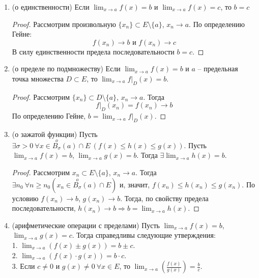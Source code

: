     \begin{enumerate}
        \item (о единственности) Если $\lim_{x \rightarrow a} f(x) = b$ и $\lim_{x \rightarrow a} f(x) = c$, то $b = c$
        \begin{proof}
            Рассмотрим произвольную $\{x_{n}\} \subset E \setminus \{a\}$, $x_{n} \rightarrow a$. По определению Гейне:
            \[f(x_{n}) \rightarrow b \text{ и } f(x_{n}) \rightarrow c\]
            В силу единственности предела последовательности $b = c$.
        \end{proof}
        \item (о пределе по подмножеству) Если $\lim_{x \rightarrow a} f(x) = b$ и $a$ -- предельная точка множества $D \subset E$, то $\lim_{x \rightarrow a} f|_{D}(x) = b$.
        \begin{proof}
            Рассмотрим $\{x_{n}\} \subset D \setminus \{a\}$, $x_{n} \rightarrow a$. Тогда
            \[f|_{D}(x_{n}) = f(x_{n}) \rightarrow b\]
            По определению Гейне, $b = \lim_{x \rightarrow a} f|_{D}(x)$.
        \end{proof}
        \item (о зажатой функции) Пусть $\exists \sigma > 0 \ \forall x \in \overset{o}{B_{\sigma}} (a) \cap E \ (f(x) \leq h(x) \leq g(x))$. Пусть $\lim_{x \rightarrow a} f(x) = b$, $\lim_{x \rightarrow a} g(x) = b$. Тогда $\exists \lim_{x \rightarrow a} h(x) = b$.
        \begin{proof}
            Рассмотрим $x_{n} \subset E \setminus \{a\}$, $x_{n} \rightarrow a$. Тогда $\exists n_{0} \ \forall n \geq n_{0} (x_{n} \in \overset{o}{B_{\sigma}}(a) \cap E)$ и, значит, $f(x_{n}) \leq h(x_{n}) \leq g(x_{n})$. По условию $f(x_{n}) \rightarrow b$, $g(x_{n}) \rightarrow b$. Тогда, по свойству предела последовательности, $h(x_{n}) \rightarrow b \Rightarrow b = \lim_{x \rightarrow a} h(x)$.
        \end{proof}
        \item (арифметические операции с пределами) Пусть $\lim_{x \rightarrow a} f(x) = b$, $\lim_{x \rightarrow a} g(x) = c$. Тогда справедливы следующие утверждения:
        \\
        1. $\lim_{x \rightarrow a} (f(x) \pm g(x)) = b \pm c$.
        \\
        2. $\lim_{x \rightarrow a} (f(x) \cdot g(x)) = b \cdot c$.
        \\
        3. Если $c \neq 0$ и $g(x) \neq 0 \ \forall x \in E$, то $\lim_{x \rightarrow a} (\frac{f(x)}{g(x)}) = \frac{b}{c}$.
        

\end{enumerate}
